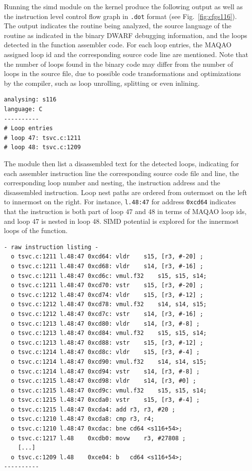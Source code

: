 \documentclass[11pt, a4paper, twoside]{montblanc2}
\begin{document}
Running the simd module on the kernel produce the following output as well as
the instruction level control flow graph in \texttt{.dot} format (see
Fig.~\ref{fig:cfgs116}). The output indicates the routine being analyzed, the
source language of the routine as indicated in the binary DWARF debugging
information, and the loops detected in the function assembler code. For each
loop entries, the MAQAO assigned loop id and the corresponding source code line
are mentioned. Note that the number of loops found in the binary code may differ
from the number of loops in the source file, due to possible code
transformations and optimizations by the compiler, such as loop unrolling,
splitting or even inlining. 

\begin{small}
\begin{verbatim}
analysing: s116
language: C
----------
# Loop entries
# loop 47: tsvc.c:1211
# loop 48: tsvc.c:1209
\end{verbatim}
\end{small}

The module then list a disassembled text for the detected loops, indicating for
each assembler instruction line the corresponding source code file and line, the
corresponding loop number and nesting, the instruction address and the
disassembled instruction. Loop nest paths are ordered from outermost on the left
to innermost on the right. For instance, \verb|l.48:47| for address
\texttt{0xcd64} indicates that the instruction is both part of loop 47 and 48
in terms of MAQAO loop ids, and loop 47 is nested in loop 48. SIMD potential is
explored for the innermost loops of the function.

\begin{small}
\begin{verbatim}
- raw instruction listing -
  o tsvc.c:1211 l.48:47 0xcd64: vldr	s15, [r3, #-20] ;
  o tsvc.c:1211 l.48:47 0xcd68: vldr	s14, [r3, #-16] ;
  o tsvc.c:1211 l.48:47 0xcd6c: vmul.f32	s15, s15, s14;
  o tsvc.c:1211 l.48:47 0xcd70: vstr	s15, [r3, #-20] ;
  o tsvc.c:1212 l.48:47 0xcd74: vldr	s15, [r3, #-12] ;
  o tsvc.c:1212 l.48:47 0xcd78: vmul.f32	s14, s14, s15;
  o tsvc.c:1212 l.48:47 0xcd7c: vstr	s14, [r3, #-16] ;
  o tsvc.c:1213 l.48:47 0xcd80: vldr	s14, [r3, #-8] ;
  o tsvc.c:1213 l.48:47 0xcd84: vmul.f32	s15, s15, s14;
  o tsvc.c:1213 l.48:47 0xcd88: vstr	s15, [r3, #-12] ;
  o tsvc.c:1214 l.48:47 0xcd8c: vldr	s15, [r3, #-4] ;
  o tsvc.c:1214 l.48:47 0xcd90: vmul.f32	s14, s14, s15;
  o tsvc.c:1214 l.48:47 0xcd94: vstr	s14, [r3, #-8] ;
  o tsvc.c:1215 l.48:47 0xcd98: vldr	s14, [r3, #0] ;
  o tsvc.c:1215 l.48:47 0xcd9c: vmul.f32	s15, s15, s14;
  o tsvc.c:1215 l.48:47 0xcda0: vstr	s15, [r3, #-4] ;
  o tsvc.c:1215 l.48:47 0xcda4: add	r3, r3, #20 ;
  o tsvc.c:1210 l.48:47 0xcda8: cmp	r3, r4;
  o tsvc.c:1210 l.48:47 0xcdac: bne	cd64 <s116+54>;
  o tsvc.c:1217 l.48    0xcdb0: movw	r3, #27808 ;
    [...]
  o tsvc.c:1209 l.48    0xce04: b	cd64 <s116+54>;
----------
\end{verbatim}
\end{small}
\end{document}
